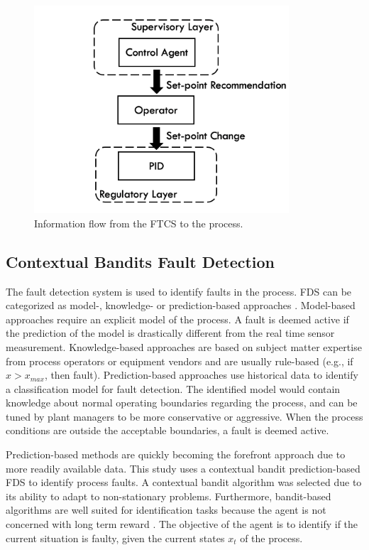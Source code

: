 \begin{figure}[h]
    \begin{center}
        \includegraphics[width=9.5cm]{images/ftc/ftc_pid_setup.png}
        \caption{\label{fig:ftc_pid_setup} Information flow from the FTCS to the process.}
    \end{center}
\end{figure}
\subsection{Contextual Bandits Fault Detection}
The fault detection system is used to identify faults in the process.  FDS can be categorized as model-, knowledge- or prediction-based approaches \cite{ftcs_diagnosis_ref7}. Model-based approaches require an explicit model of the process.  A fault is deemed active if the prediction of the model is drastically different from the real time sensor measurement.  Knowledge-based approaches are based on subject matter expertise from process operators or equipment vendors and are usually rule-based (e.g., if $x > x_{max}$, then fault). Prediction-based approaches use historical data to identify a classification model for fault detection. The identified model would contain knowledge about normal operating boundaries regarding the process, and can be tuned by plant managers to be more conservative or aggressive. When the process conditions are outside the acceptable boundaries, a fault is deemed active. 

Prediction-based methods are quickly becoming the forefront approach due to more readily available data. This study uses a contextual bandit prediction-based FDS to identify process faults. A contextual bandit algorithm was selected due to its ability to adapt to non-stationary problems.  Furthermore, bandit-based algorithms are well suited for identification tasks because the agent is not concerned with long term reward \cite{sutton}. The objective of the agent is to identify if the current situation is faulty, given the current states $x_t$ of the process. 

